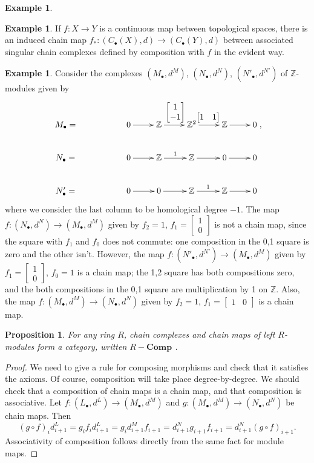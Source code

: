 \documentclass{amsart}[12pt]
\newcommand{\Z}{\mathbb{Z}}
\newcommand{\Def}[1]{#1 \index{#1}}
\numberwithin{equation}{section}
\theoremstyle{plain} %
\newtheorem{prop}[equation]{Proposition}
\theoremstyle{definition}
\newtheorem{ex}[equation]{Example}
\theoremstyle{remark}
\newcommand{\Cx}[1]{#1-\mathbf{Comp}}
\begin{document}
\begin{ex}
   \begin{ex} If $f: X \to Y$ is a continuous map between topological spaces, there is an induced chain map $f_*: (C_\bullet(X), d) \to (C_\bullet(Y), d)$ between
      associated singular chain complexes defined by composition with $f$ in the evident way.
    \end{ex}

\begin{ex} Consider the complexes $(M_\bullet, d^M)$, $(N_\bullet, d^N)$, $(N'_\bullet, d^{N'})$ of $\Z$-modules given by
\[ \xymatrix{ M_\bullet =  & & 0 \ar[r] & \Z \ar[r]^{\begin{bmatrix} 1 \\ -1 \end{bmatrix}} & \Z^2 \ar[r]^{\begin{bmatrix} 1 & 1 \end{bmatrix}} & \Z \ar[r] & 0 \\
N_\bullet =  & & 0 \ar[r] & \Z \ar[r]^{1} & \Z \ar[r]  & 0 \ar[r] & 0 \\
N'_\bullet =  & & 0 \ar[r] & 0 \ar[r] &\Z \ar[r]^{1} & \Z \ar[r]  &  0},\]
where we consider the last column to be homological degree $-1$.
The map $f:(N_\bullet, d^N) \to (M_\bullet, d^M)$ given by $f_2=1$, $f_1=\begin{bmatrix} 1 \\ 0\end{bmatrix}$ is not a chain map, since the square with $f_1$ and $f_0$ does not commute: one composition in the 0,1 square is zero and the other isn't. However, the map $f:(N'_\bullet, d^{N'}) \to (M_\bullet, d^M)$ given by $f_1=\begin{bmatrix} 1 \\ 0\end{bmatrix}$, $f_0=1$ is a chain map; the 1,2 square has both compositions zero, and the both compositions in the 0,1 square are multiplication by 1 on $\Z$. Also, the map $f:(M_\bullet, d^{M}) \to (N_\bullet, d^N)$ given by $f_2=1$, $f_1=\begin{bmatrix} 1 & 0\end{bmatrix}$ is a chain map.
\end{ex}

    \begin{prop} For any ring $R$, chain complexes and chain maps of left $R$-modules 
form a category, written \Def{$\Cx{R}$}.
\end{prop}
\begin{proof} We need to give a rule for composing morphisms and check that it satisfies the axioms. Of course, composition will take place degree-by-degree. We should check that a composition of chain maps is a chain map, and that composition is associative. Let $f:  (L_\bullet ,d^L)\to (M_\bullet ,d^M)$ and $g: (M_\bullet ,d^M)\to (N_\bullet ,d^N)$ be chain maps. Then \[(g\circ f)_i d^L_{i+1} = g_i f_i d^L_{i+1} = g_i d^M_{i+1} f_{i+1} = d^N_{i+1} g_{i+1} f_{i+1} = d^N_{i+1} (g \circ f)_{i+1}.\]
Associativity of composition follows directly from the same fact for module maps.
\end{proof}


\end{ex}
\end{document}
